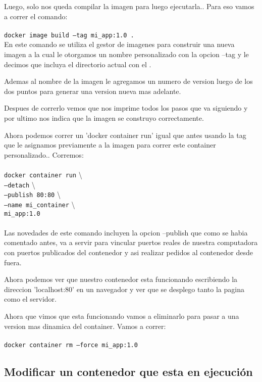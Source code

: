 \documentclass[11pt]{article} %
\begin{document}
Luego, solo nos queda compilar la imagen para luego ejecutarla.. Para eso vamos a correr el comando: \\ \\
	\texttt{docker image build --tag mi\_app:1.0 .} \\

En este comando se utiliza el gestor de imagenes para construir una nueva imagen a la cual le otorgamos un nombre personalizado con la opcion --tag y le decimos que incluya el directorio actual con el .

Ademas al nombre de la imagen le agregamos un numero de version luego de los dos puntos para generar una version nueva mas adelante.

Despues de correrlo vemos que nos imprime todos los pasos que va siguiendo y por ultimo nos indica que la imagen se construyo correctamente.

Ahora podemos correr un 'docker container run' igual que antes usando la tag que le asignamos previamente a la imagen para correr este container personalizado.. Corremos: \\ \\
	\texttt{docker container run} \textbackslash \\
	\texttt{--detach} \textbackslash \\
	\texttt{--publish 80:80} \textbackslash \\
	\texttt{--name mi\_container} \textbackslash \\
	\texttt{mi\_app:1.0} \\ \\

Las novedades de este comando incluyen la opcion --publish que como se habia comentado antes, va a servir para vincular puertos reales de nuestra computadora con puertos publicados del contenedor y asi realizar pedidos al contenedor desde fuera.

Ahora podemos ver que nuestro contenedor esta funcionando escribiendo la direccion 'localhost:80' en un navegador y ver que se desplego tanto la pagina como el servidor.

Ahora que vimos que esta funcionando vamos a eliminarlo para pasar a una version mas dinamica del container. Vamos a correr:\\ \\
	\texttt{docker container rm --force mi\_app:1.0} \\

\subsection{Modificar un contenedor que esta en ejecución}
\end{document}

